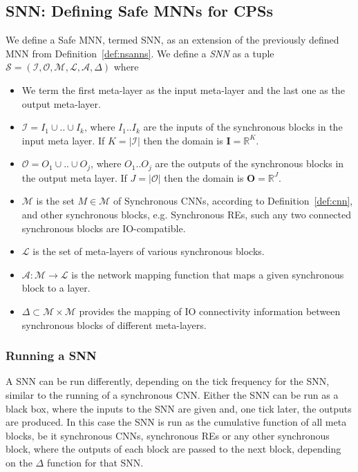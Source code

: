 \subsection{\ac{SNN}: Defining Safe \acp{MNN} for \acp{CPS}}
\begin{definition}
	\label{def:snn}
	We define a Safe \ac{MNN}, termed \ac{SNN}, as an extension of the previously defined \ac{MNN} from Definition~\ref{def:nsanns}. We define a \emph{\ac{SNN}} as a tuple $\mathcal{S} = (\mathcal{I}, \mathcal{O}, \mathcal{M}, \mathcal{L}, \mathcal{A}, \Delta)$ where
	\begin{itemize}
		\item We term the first meta-layer as the input
		meta-layer and the last one as the output
		meta-layer.
		\item  $\mathcal{I}=I_1 \cup .. \cup I_k$,
		where $I_1..I_k$ are the inputs of the synchronous blocks in
		the input meta layer. If $K=|\mathcal{I}|$ then the
		domain is $\mathbf{I} = \mathbb{R}^K$.
		\item $\mathcal{O}=O_1 \cup .. \cup O_j$,
		where $O_1..O_j$ are the outputs of the synchronous blocks in
		the output meta layer. If $J=|\mathcal{O}|$ then the domain is $\mathbf{O} = \mathbb{R}^J$.
		\item $\mathcal{M}$ is the set $M \in \mathcal{M}$ of
		Synchronous \acp{CNN}, according to Definition~\ref{def:cnn}, and other synchronous blocks, e.g. Synchronous \acfp{RE}, 
		such any two connected synchronous blocks are IO-compatible.
		\item $\mathcal{L}$ is the set of meta-layers of various synchronous blocks.
		\item $\mathcal{A}: \mathcal{M} \rightarrow \mathcal{L}$ is the network mapping function that maps a given synchronous block to a layer.
		\item $\Delta \subset \mathcal{M} \times \mathcal{M}$ provides the mapping of IO connectivity information between synchronous blocks of different meta-layers.
	\end{itemize}
\end{definition}

\subsubsection{Running a \ac{SNN}}
A \ac{SNN} can be run differently, depending on the tick frequency for the \ac{SNN}, similar to the running of a synchronous \ac{CNN}.
Either the \ac{SNN} can be run as a black box, where the inputs to the \ac{SNN} are given and, one tick later, the outputs are produced.
In this case the \ac{SNN} is run as the cumulative function of all meta blocks, be it synchronous \acp{CNN}, synchronous \acp{RE} or any other synchronous block, where the outputs of each block are passed to the next block, depending on the $\Delta$ function for that \ac{SNN}.

